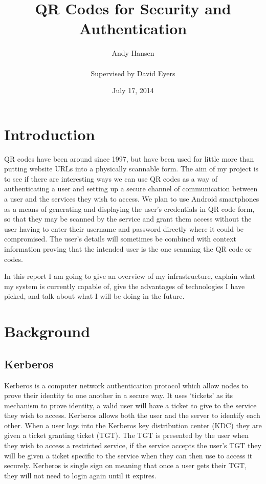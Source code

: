 \documentclass[]{report}   %
\begin{document}
\title{QR Codes for Security and Authentication}
\author{Andy Hansen\\\\
Supervised by David Eyers} 
\date{July 17, 2014} 
\maketitle
\tableofcontents

\section{Introduction}
QR codes have been around since 1997, but have been used for little more than putting website URLs into a physically scannable form. The aim of my project is to see if there are interesting ways we can use QR codes as a way of authenticating a user and setting up a secure channel of communication between a user and the services they wish to access. We plan to use Android smartphones as a means of generating and displaying the user's credentials in QR code form, so that they may be scanned by the service and grant them access without the user having to enter their username and password directly where it could be compromised. The user's details will sometimes be combined with context information proving that the intended user is the one scanning the QR code or codes.

In this report I am going to give an overview of my infrastructure, explain what my system is currently capable of, give the advantages of technologies I have picked, and talk about what I will be doing in the future.

\section{Background}    
\subsection{Kerberos}   
Kerberos \cite{Kerb} is a computer network authentication protocol which allow nodes to prove their identity to one another in a secure way. It uses ‘tickets’ as its mechanism to prove identity, a valid user will have a ticket to give to the service they wish to access. Kerberos allows both the user and the server to identify each other. When a user logs into the Kerberos key distribution center (KDC) they are given a ticket granting ticket (TGT). The TGT is presented by the user when they wish to access a restricted service, if the service accepts the user's TGT they will be given a ticket specific to the service when they can then use to access it securely. Kerberos is single sign on meaning that once a user gets their TGT, they will not need to login again until it expires.
\end{document}
